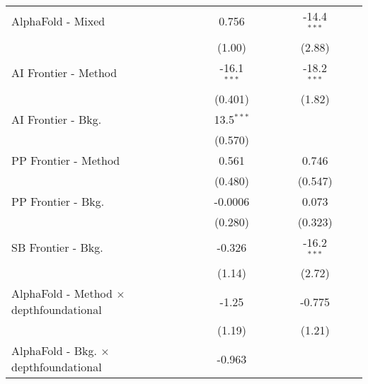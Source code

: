 \begin{tabular}{lcccccccc}
   AlphaFold - Mixed                              &         & 0.756         &       &       &             & -14.4$^{***}$ &      &   \\   
                                                  &         & (1.00)        &       &       &             & (2.88)        &      &   \\   
   AI Frontier - Method                           &         & -16.1$^{***}$ &       &       &             & -18.2$^{***}$ &      &   \\   
                                                  &         & (0.401)       &       &       &             & (1.82)        &      &   \\   
   AI Frontier - Bkg.                             &         & 13.5$^{***}$  &       &       &             &               &      &   \\   
                                                  &         & (0.570)       &       &       &             &               &      &   \\   
   PP Frontier - Method                           &         & 0.561         &       &       &             & 0.746         &      &   \\   
                                                  &         & (0.480)       &       &       &             & (0.547)       &      &   \\   
   PP Frontier - Bkg.                             &         & -0.0006       &       &       &             & 0.073         &      &   \\   
                                                  &         & (0.280)       &       &       &             & (0.323)       &      &   \\   
   SB Frontier - Bkg.                             &         & -0.326        &       &       &             & -16.2$^{***}$ &      &   \\   
                                                  &         & (1.14)        &       &       &             & (2.72)        &      &   \\   
   AlphaFold - Method $\times$ depthfoundational  &         & -1.25         &       &       &             & -0.775        &      &   \\   
                                                  &         & (1.19)        &       &       &             & (1.21)        &      &   \\   
   AlphaFold - Bkg. $\times$ depthfoundational    &         & -0.963        &       &       &             &               &      &   \\   

\end{tabular}
